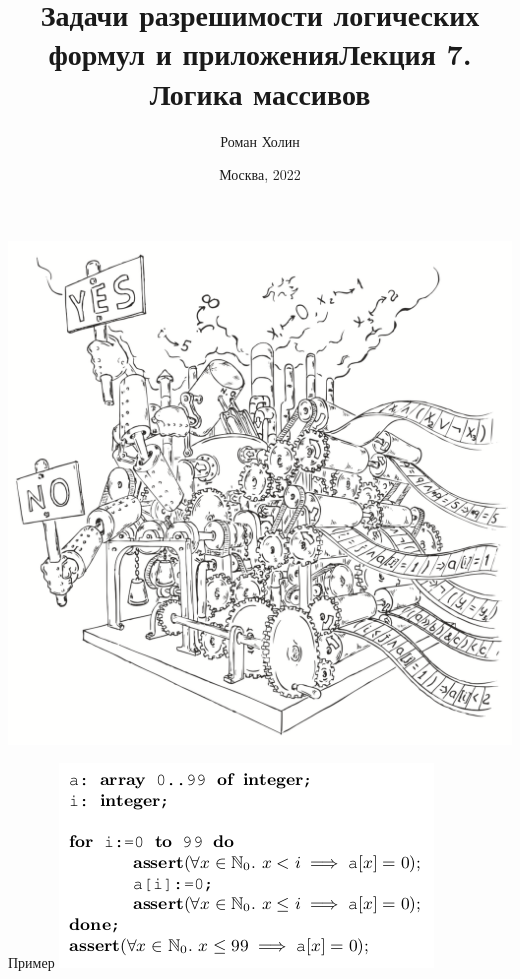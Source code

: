 \documentclass{beamer}
\begin{document}
\title{Задачи разрешимости логических формул и приложения\newline Лекция 7. Логика массивов}
\author{Роман Холин}
\date{Москва, 2022}

\begin{frame}
\includegraphics[scale=0.5]{../decision-procedure.png}
\end{frame}

\frame{\titlepage}

\begin{frame}{Пример}
\includegraphics[scale=0.5]{code.png}
\end{frame}
\end{document}
